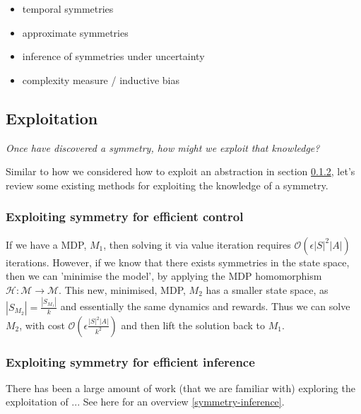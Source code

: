 \begin{itemize}
\tightlist
  \item temporal symmetries
  \item approximate symmetries
  \item inference of symmetries under uncertainty
  \item complexity measure / inductive bias
\end{itemize}




\subsection{Exploitation} \label{symmetric-exploitation}

\begin{displayquote}
\textit{Once have discovered a symmetry, how might we exploit that knowledge?}
\end{displayquote}

Similar to how we considered how to exploit an abstraction in section \ref{},
let's review some existing methods for exploiting the knowledge of a symmetry. \footnotemark[22]


\subsubsection{Exploiting symmetry for efficient control}

If we have a MDP, $M_1$, then solving it via value iteration requires $\mathcal O(\epsilon |S|^2|A|)$ iterations.
However, if we know that there exists symmetries in the state space, then we can 'minimise the model',
by applying the MDP homomorphism $\mathcal H: \mathcal M\to \mathcal M$.
This new, minimised, MDP, $M_2$ has a smaller state space, as $|S_{M_2}| = \frac{|S_{M_1}|}{k}$
and essentially the same dynamics and rewards. Thus we can solve $M_2$, with cost $\mathcal O(\epsilon \frac{|S|^2|A|}{k^2})$
and then lift the solution back to $M_1$. \cite{Dean1997, NARAYANAMURTHY}


\subsubsection{Exploiting symmetry for efficient inference}

There has been a large amount of work (that we are familiar with) exploring
the exploitation of ... See  here for an overview \ref{symmetry-inference}.

